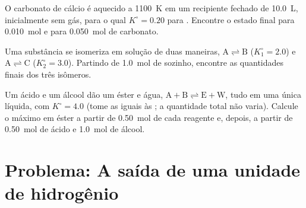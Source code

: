 \begin{exercise}[$\star\star\star$]\label{exo:b1:extent-q-and-k:10}
O carbonato de cálcio é aquecido a \qty{1100}{K} em um recipiente
fechado de \qty{10.0}{L}, inicialmente sem gás, para o qual
$K^\circ = 0.20$ para . Encontre o
estado final para \qty{0.010}{mol} e para \qty{0.050}{mol} de carbonato.
\end{exercise}

\begin{exercise}[$\star\star\star$]\label{exo:b1:extent-q-and-k:11}
Uma substância  se isomeriza em solução de duas maneiras, $\mathrm{A \rightleftharpoons B}$
($K_1^\circ = 2.0$) e $\mathrm{A \rightleftharpoons C}$ ($K_2^\circ = 3.0$). Partindo de
\qty{1.0}{mol} de  sozinho, encontre as quantidades finais dos três
isômeros.
\end{exercise}

\begin{exercise}[$\star\star\star$]\label{exo:b1:extent-q-and-k:12}
Um ácido  e um álcool  dão um éster e água, $\mathrm{A + B
\rightleftharpoons E + W}$, tudo em uma única  líquida, com $K^\circ = 4.0$ (tome
as  iguais às ; a quantidade total não varia).
Calcule o  máximo em éster a partir de \qty{0.50}{mol} de cada
reagente e, depois, a partir de \qty{0.50}{mol} de ácido e \qty{1.0}{mol}
de álcool.
\end{exercise}

\section{Problema: A saída de uma unidade de hidrogênio}

